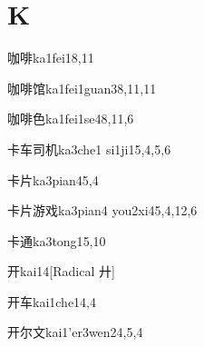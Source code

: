 
\section*{K}

\begin{verbete}{咖啡}{ka1fei1}{8,11}
\end{verbete}

\begin{verbete}{咖啡馆}{ka1fei1guan3}{8,11,11}
\end{verbete}

\begin{verbete}{咖啡色}{ka1fei1se4}{8,11,6}
\end{verbete}

\begin{verbete}{卡车司机}{ka3che1 si1ji1}{5,4,5,6}
\end{verbete}

\begin{verbete}{卡片}{ka3pian4}{5,4}
\end{verbete}

\begin{verbete}{卡片游戏}{ka3pian4 you2xi4}{5,4,12,6}
\end{verbete}

\begin{verbete}{卡通}{ka3tong1}{5,10}
\end{verbete}

\begin{verbete}{开}{kai1}{4}[Radical 廾]
\end{verbete}

\begin{verbete}{开车}{kai1che1}{4,4}
\end{verbete}

\begin{verbete}{开尔文}{kai1'er3wen2}{4,5,4}
\end{verbete}

